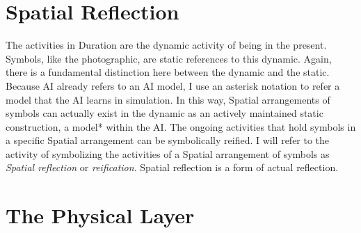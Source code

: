 \section{Spatial Reflection}

The activities in Duration are the dynamic activity of being in the
present.  Symbols, like the photographic, are static references to
this dynamic.  Again, there is a fundamental distinction here between
the dynamic and the static.  Because AI already refers to an AI model,
I use an asterisk notation to refer a model that the AI learns in
simulation.  In this way, Spatial arrangements of symbols can actually
exist in the dynamic as an actively maintained static construction, a
model* within the AI.  The ongoing activities that hold symbols in a
specific Spatial arrangement can be symbolically reified.  I will
refer to the activity of symbolizing the activities of a Spatial
arrangement of symbols as \emph{Spatial reflection} or
\emph{reification}.  Spatial reflection is a form of actual
reflection.

\section{The Physical Layer}

